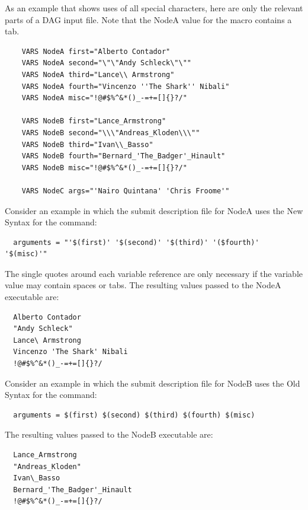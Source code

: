 As an example that shows uses of all special characters, 
here are only the relevant parts of a DAG input file.
Note that the NodeA value for the macro  contains a tab.
\footnotesize
\begin{verbatim}
    VARS NodeA first="Alberto Contador"
    VARS NodeA second="\"\"Andy	Schleck\"\""
    VARS NodeA third="Lance\\ Armstrong"
    VARS NodeA fourth="Vincenzo ''The Shark'' Nibali"
    VARS NodeA misc="!@#$%^&*()_-=+=[]{}?/"
    
    VARS NodeB first="Lance_Armstrong"
    VARS NodeB second="\\\"Andreas_Kloden\\\""
    VARS NodeB third="Ivan\\_Basso"
    VARS NodeB fourth="Bernard_'The_Badger'_Hinault"
    VARS NodeB misc="!@#$%^&*()_-=+=[]{}?/"

    VARS NodeC args="'Nairo Quintana' 'Chris Froome'"
\end{verbatim}
\normalsize

Consider an example in which
the submit description file for NodeA uses the New Syntax for the
 command:
\footnotesize
\begin{verbatim}
  arguments = "'$(first)' '$(second)' '$(third)' '($fourth)' '$(misc)'"
\end{verbatim}
\normalsize
The single quotes around each variable reference are only necessary
if the variable value may contain spaces or tabs.
The resulting values passed to the NodeA executable are:
\footnotesize
\begin{verbatim}
  Alberto Contador
  "Andy	Schleck"
  Lance\ Armstrong
  Vincenzo 'The Shark' Nibali
  !@#$%^&*()_-=+=[]{}?/
\end{verbatim}
\normalsize

Consider an example in which
the submit description file for NodeB uses the Old Syntax for the
 command:
\footnotesize
\begin{verbatim}
  arguments = $(first) $(second) $(third) $(fourth) $(misc)
\end{verbatim}
\normalsize

The resulting values passed to the NodeB executable are:
\footnotesize
\begin{verbatim}
  Lance_Armstrong
  "Andreas_Kloden"
  Ivan\_Basso
  Bernard_'The_Badger'_Hinault
  !@#$%^&*()_-=+=[]{}?/
\end{verbatim}
\normalsize

